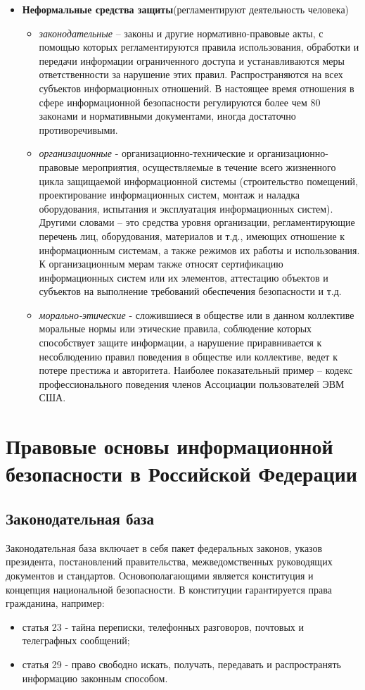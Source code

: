 \documentclass{article}
\begin{document}
\begin{itemize}
\item \textbf{Неформальные средства защиты}(регламентируют деятельность человека)
\begin{itemize}
\item \textit{законодательные} – законы и другие нормативно-правовые акты, с помощью которых регламентируются правила использования, обработки и передачи информации ограниченного доступа и устанавливаются меры ответственности за нарушение этих правил. Распространяются на всех субъектов информационных отношений. В настоящее время отношения в сфере информационной безопасности регулируются более чем 80 законами и нормативными документами, иногда достаточно противоречивыми.
\item \textit{организационные} - организационно-технические и организационно-правовые мероприятия, осуществляемые в течение всего жизненного цикла защищаемой информационной системы (строительство помещений, проектирование информационных систем, монтаж и наладка оборудования, испытания и эксплуатация информационных систем). Другими словами – это средства уровня организации, регламентирующие перечень лиц, оборудования, материалов и т.д., имеющих отношение к информационным системам, а также режимов их работы и использования. К организационным мерам также относят сертификацию информационных систем или их элементов, аттестацию объектов и субъектов на выполнение требований обеспечения безопасности и т.д.
\item \textit{морально-этические} - сложившиеся в обществе или в данном коллективе моральные нормы или этические правила, соблюдение которых способствует защите информации, а нарушение приравнивается к несоблюдению правил поведения в обществе или коллективе, ведет к потере престижа и авторитета. Наиболее показательный пример – кодекс профессионального поведения членов Ассоциации пользователей ЭВМ США.
\end{itemize}
\end{itemize}
\section{ Правовые основы информационной безопасности в Российской Федерации }
\subsection { Законодательная база }
Законодательная база включает в себя пакет федеральных законов, указов президента, постановлений правительства, межведомственных руководящих документов и стандартов. Основополагающими является конституция и концепция национальной безопасности. В конституции гарантируется права гражданина, например:
\begin{itemize}
\item статья 23 - тайна переписки, телефонных разговоров, почтовых и телеграфных сообщений;
\item статья 29 - право свободно искать, получать, передавать и распространять информацию законным способом.
\end{itemize}
\end{document}
